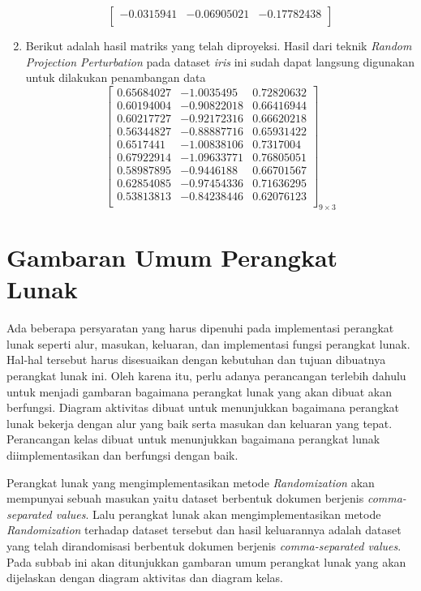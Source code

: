 \begin{enumerate}
\[\begin{bmatrix}
        -0.0315941  &  -0.06905021  & -0.17782438 \\
        \end{bmatrix}
    \]
    \item Berikut adalah hasil matriks yang telah diproyeksi. Hasil dari teknik \textit{Random Projection Perturbation} pada dataset \textit{iris} ini sudah dapat langsung digunakan untuk dilakukan penambangan data
    \[
        \begin{bmatrix}
        0.65684027 &  -1.0035495   &  0.72820632 \\
        0.60194004 &  -0.90822018  &  0.66416944 \\
        0.60217727  & -0.92172316  &  0.66620218 \\
        0.56344827 &  -0.88887716  &  0.65931422 \\
        0.6517441   & -1.00838106  &  0.7317004  \\
        0.67922914  & -1.09633771  &  0.76805051 \\
        0.58987895  & -0.9446188   &  0.66701567 \\
        0.62854085  & -0.97454336  &  0.71636295 \\
        0.53813813  & -0.84238446  &  0.62076123 \\
        \end{bmatrix}_{9\times 3}
    \]
\end{enumerate}

\section{Gambaran Umum Perangkat Lunak}
\label{sec:gambaran-pl}

Ada beberapa persyaratan yang harus dipenuhi pada implementasi perangkat lunak seperti alur, masukan, keluaran, dan implementasi fungsi perangkat lunak. Hal-hal tersebut harus disesuaikan dengan kebutuhan dan tujuan dibuatnya perangkat lunak ini. Oleh karena itu, perlu adanya perancangan terlebih dahulu untuk menjadi gambaran bagaimana perangkat lunak yang akan dibuat akan berfungsi. Diagram aktivitas dibuat untuk menunjukkan bagaimana perangkat lunak bekerja dengan alur yang baik serta masukan dan keluaran yang tepat. Perancangan kelas dibuat untuk menunjukkan bagaimana perangkat lunak diimplementasikan dan berfungsi dengan baik.

Perangkat lunak yang mengimplementasikan metode \textit{Randomization} akan mempunyai sebuah masukan yaitu dataset berbentuk dokumen berjenis \textit{comma-separated values}. Lalu perangkat lunak akan mengimplementasikan metode \textit{Randomization} terhadap dataset tersebut dan hasil keluarannya adalah dataset yang telah dirandomisasi berbentuk dokumen berjenis \textit{comma-separated values}. Pada subbab ini akan ditunjukkan gambaran umum perangkat lunak yang akan dijelaskan dengan diagram aktivitas dan diagram kelas.

